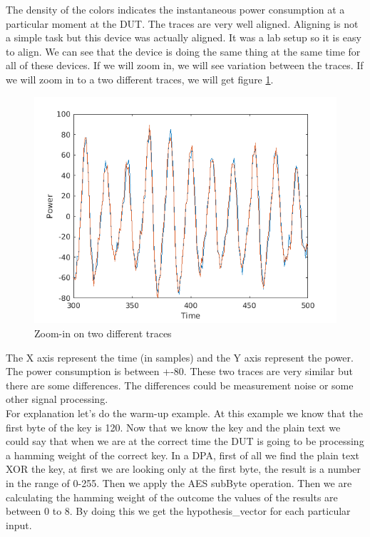 The density of the colors indicates the instantaneous power consumption at a particular moment at the DUT. The traces are very well aligned. Aligning is not a simple task but this device was actually aligned. It was a lab setup so it is easy to align. We can see that the device is doing the same thing at the same time for all of these devices. If we will zoom in, we will see variation between the traces. If we will zoom in to a two different traces, we will get figure \ref{c8_Matlab_zoomin_on_two_traces:fig}.
\begin{figure}[!ht]
    \centering
    \includegraphics[width=1.0\textwidth]{images/chapter8/TwoSamples.png}
    \caption{Zoom-in on two different traces} \label{c8_Matlab_zoomin_on_two_traces:fig}
\end{figure}
The X axis represent the time (in samples) and the Y axis represent the power. The power consumption is between +-80. These two traces are very similar but there are some differences. The differences could be measurement noise or some other signal processing.\\
For explanation let's do the warm-up example. At this example we know that the first byte of the key is 120. Now that we know the key and the plain text we could say that when we are at the correct time the DUT is going to be processing a hamming weight of the correct key. In a DPA, first of all we find the plain text XOR the key, at first we are looking only at the first byte, the result is a number in the range of 0-255. Then we apply the AES subByte operation. Then we are calculating the hamming weight of the outcome the values of the results are between 0 to 8. By doing this we get the hypothesis\_vector for each particular input.

